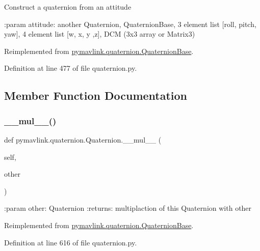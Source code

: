 \begin{DoxyVerb}Construct a quaternion from an attitude

:param attitude: another Quaternion, QuaternionBase,
    3 element list [roll, pitch, yaw],
    4 element list [w, x, y ,z], DCM (3x3 array or Matrix3)
\end{DoxyVerb}
 

Reimplemented from \mbox{\hyperlink{classpymavlink_1_1quaternion_1_1QuaternionBase_a6bfc9e17d697406593e6757969c36bf2}{pymavlink.\+quaternion.\+Quaternion\+Base}}.



Definition at line 477 of file quaternion.\+py.



\subsection{Member Function Documentation}
\mbox{\label{classpymavlink_1_1quaternion_1_1Quaternion_af3d7ea873b5cc8bea69d2664b8e6dcc9}} 
\subsubsection{\texorpdfstring{\_\_mul\_\_()}{\_\_mul\_\_()}}
{\footnotesize\ttfamily def pymavlink.\+quaternion.\+Quaternion.\+\_\+\+\_\+mul\+\_\+\+\_\+ (\begin{DoxyParamCaption}\item[{}]{self,  }\item[{}]{other }\end{DoxyParamCaption})}

\begin{DoxyVerb}:param other: Quaternion
:returns: multiplaction of this Quaternion with other
\end{DoxyVerb}
 

Reimplemented from \mbox{\hyperlink{classpymavlink_1_1quaternion_1_1QuaternionBase_a694593af9f5007fc418b1473c3b32496}{pymavlink.\+quaternion.\+Quaternion\+Base}}.



Definition at line 616 of file quaternion.\+py.

\mbox{\label{classpymavlink_1_1quaternion_1_1Quaternion_a768c82f6b6fbb4e9c3a496e494a0c587}} 
